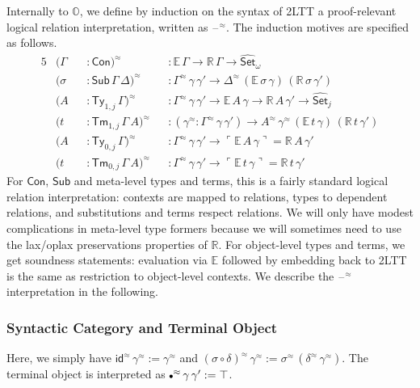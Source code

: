 \documentclass[acmsmall,screen]{acmart}
\newcommand{\msf}[1]{\mathsf{#1}}
\newcommand{\mbb}[1]{\mathbb{#1}}
\newcommand{\wh}[1]{\widehat{#1}}
\newcommand{\mbbo}{\mbb{O}}
\newcommand{\Con}{\msf{Con}}
\newcommand{\Sub}{\msf{Sub}}
\newcommand{\Ty}{\msf{Ty}}
\newcommand{\Tm}{\msf{Tm}}
\newcommand{\emptycon}{\scaleobj{.75}\bullet}
\newcommand{\id}{\msf{id}}
\newcommand{\Set}{\mathsf{Set}}
\newcommand{\blank}{{\mathord{\hspace{1pt}\text{--}\hspace{1pt}}}}
\newcommand{\emb}[1]{\ulcorner#1\urcorner}
\newcommand{\hato}{\bm\hat{\mbbo}}
\newcommand{\ev}{\mbb{E}}
\newcommand{\re}{\mbb{R}}
\theoremstyle{remark}
\newcommand{\whset}{\wh{\Set}}
\newcommand{\rel}{^{\approx}}
\begin{document}
Internally to $\hato$, we define by induction on the syntax of 2LTT a
proof-relevant logical relation interpretation, written as $\blank^{\approx}$. The induction
motives are specified as follows.
\begin{alignat*}{5}
  &(\Gamma &&: \Con)\rel && : \ev\,\Gamma \to \re\,\Gamma \to \whset_\omega\\
  &(\sigma &&: \Sub\,\Gamma\,\Delta)\rel &&: \Gamma\rel\,\gamma\,\gamma' \to \Delta\rel\,(\ev\,\sigma\,\gamma)\,(\re\,\sigma\,\gamma')\\
  &(A      &&: \Ty_{1,j}\,\Gamma)\rel &&: \Gamma\rel\,\gamma\,\gamma' \to \ev\,A\,\gamma \to \re\,A\,\gamma' \to \whset_j\\
  &(t      &&: \Tm_{1,j}\,\Gamma\,A)\rel &&: (\gamma\rel : \Gamma\rel\,\gamma\,\gamma') \to A\rel\,\gamma\rel\,(\ev\,t\,\gamma)\,(\re\,t\,\gamma')\\
  &(A      &&: \Ty_{0,j}\,\Gamma)\rel &&: \Gamma\rel\,\gamma\,\gamma' \to \emb{\ev\,A\,\gamma} = \re\,A\,\gamma' \\
  &(t      &&: \Tm_{0,j}\,\Gamma\,A)\rel &&: \Gamma\rel\,\gamma\,\gamma' \to \emb{\ev\,t\,\gamma} = \re\,t\,\gamma'
\end{alignat*}
For $\Con$, $\Sub$ and meta-level types and terms, this is a fairly standard
logical relation interpretation: contexts are mapped to relations, types to
dependent relations, and substitutions and terms respect relations. We will only have
modest complications in meta-level type formers because we will sometimes need to use
the lax/oplax preservations properties of $\re$. For object-level types and
terms, we get soundness statements: evaluation via $\ev$ followed by embedding
back to 2LTT is the same as restriction to object-level contexts. We describe
the $\blank\rel$ interpretation in the following.

\subsubsection{Syntactic Category and Terminal Object}
Here, we simply have $\id\rel\,\gamma\rel := \gamma\rel$ and $(\sigma \circ
\delta)\rel\,\gamma\rel := \sigma\rel\,(\delta\rel\,\gamma\rel)$. The terminal
object is interpreted as $\emptycon\rel\,\gamma\,\gamma' := \top$.
\end{document}
